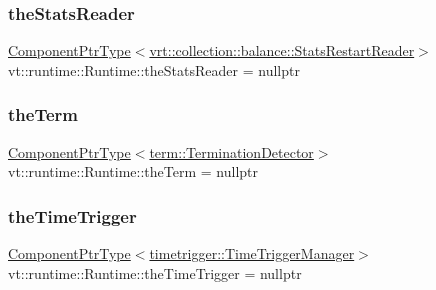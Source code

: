 \subsubsection{\texorpdfstring{the\+Stats\+Reader}{theStatsReader}}
{\footnotesize\ttfamily \hyperlink{structvt_1_1runtime_1_1_runtime_a0893bf0a8c03b898e8ab66b52cec80ad}{Component\+Ptr\+Type}$<$\hyperlink{structvt_1_1vrt_1_1collection_1_1balance_1_1_stats_restart_reader}{vrt\+::collection\+::balance\+::\+Stats\+Restart\+Reader}$>$ vt\+::runtime\+::\+Runtime\+::the\+Stats\+Reader = nullptr}

\mbox{\label{structvt_1_1runtime_1_1_runtime_a365e1addbed82440bb014f97b1c839f6}} 
\subsubsection{\texorpdfstring{the\+Term}{theTerm}}
{\footnotesize\ttfamily \hyperlink{structvt_1_1runtime_1_1_runtime_a0893bf0a8c03b898e8ab66b52cec80ad}{Component\+Ptr\+Type}$<$\hyperlink{structvt_1_1term_1_1_termination_detector}{term\+::\+Termination\+Detector}$>$ vt\+::runtime\+::\+Runtime\+::the\+Term = nullptr}

\mbox{\label{structvt_1_1runtime_1_1_runtime_a3d72d73ecd4ba3f0104dca596eae3862}} 
\subsubsection{\texorpdfstring{the\+Time\+Trigger}{theTimeTrigger}}
{\footnotesize\ttfamily \hyperlink{structvt_1_1runtime_1_1_runtime_a0893bf0a8c03b898e8ab66b52cec80ad}{Component\+Ptr\+Type}$<$\hyperlink{structvt_1_1timetrigger_1_1_time_trigger_manager}{timetrigger\+::\+Time\+Trigger\+Manager}$>$ vt\+::runtime\+::\+Runtime\+::the\+Time\+Trigger = nullptr}

\mbox{\label{structvt_1_1runtime_1_1_runtime_a85a0606ac06cd173561952676f09c077}} 
